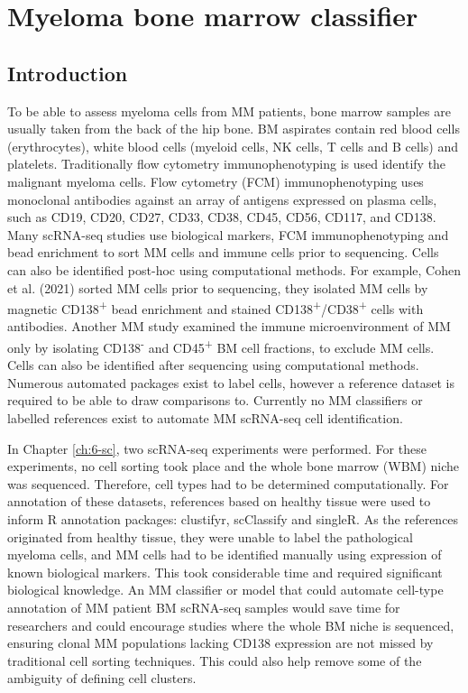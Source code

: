 \section{Myeloma bone marrow classifier}\label{sec:MM_classifier}
\subsection{Introduction}
To be able to assess myeloma cells from MM patients, bone marrow samples are usually taken from the back of the hip bone.
BM aspirates contain red blood cells (erythrocytes), white blood cells (myeloid cells, NK cells, T cells and B cells) and platelets.
Traditionally flow cytometry immunophenotyping is used identify the malignant myeloma cells.
Flow cytometry (FCM) immunophenotyping uses monoclonal antibodies against an array of antigens expressed on plasma cells, such as CD19, CD20, CD27, CD33, CD38, CD45, CD56, CD117, and CD138\cite{jeong2012simplified}.
Many scRNA-seq studies use biological markers, FCM immunophenotyping and bead enrichment to sort MM cells and immune cells prior to sequencing.
Cells can also be identified post-hoc using computational methods.
For example, Cohen et al. (2021) sorted MM cells prior to sequencing, they isolated MM cells by magnetic CD138\textsuperscript{+} bead enrichment and stained CD138\textsuperscript{+}/CD38\textsuperscript{+} cells with antibodies\cite{cohen2021identification}.
Another MM study examined the immune microenvironment of MM only by isolating CD138\textsuperscript{-} and CD45\textsuperscript{+} BM cell fractions, to exclude MM cells\cite{zavidij2020single}.
Cells can also be identified after sequencing using computational methods.
Numerous automated packages exist to label cells, however a reference dataset is required to be able to draw comparisons to.
Currently no MM classifiers or labelled references exist to automate MM scRNA-seq cell identification.

In Chapter \ref{ch:6-sc}, two scRNA-seq experiments were performed.
For these experiments, no cell sorting took place and the whole bone marrow (WBM) niche was sequenced.
Therefore, cell types had to be determined computationally.
For annotation of these datasets, references based on healthy tissue were used to inform R annotation packages: clustifyr, scClassify and singleR.
As the references originated from healthy tissue, they were unable to label the pathological myeloma cells, and MM cells had to be identified manually using expression of known biological markers.
This took considerable time and required significant biological knowledge.
An MM classifier or model that could automate cell-type annotation of MM patient BM scRNA-seq samples would save time for researchers and could encourage studies where the whole BM niche is sequenced, ensuring clonal MM populations lacking CD138 expression are not missed by traditional cell sorting techniques.
This could also help remove some of the ambiguity of defining cell clusters.

